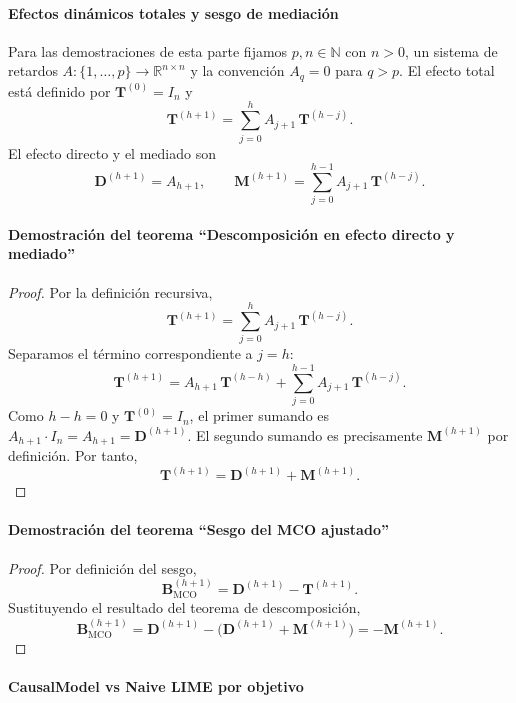 \documentclass[12pt]{report} %
\begin{document}
\paragraph*{Efectos dinámicos totales y sesgo de mediación}

Para las demostraciones de esta parte fijamos $p, n \in \mathbb{N}$ con $n > 0$, un sistema de retardos $A : \{1, \ldots, p\} \to \mathbb{R}^{n \times n}$ y la convención $A_q = 0$ para $q > p$. El efecto total está definido por $\mathbf{T}^{(0)} = I_n$ y
$$\mathbf{T}^{(h+1)} = \sum_{j=0}^{h} A_{j+1}\,\mathbf{T}^{(h-j)}.$$
El efecto directo y el mediado son
$$\mathbf{D}^{(h+1)} = A_{h+1}, \qquad \mathbf{M}^{(h+1)} = \sum_{j=0}^{h-1} A_{j+1}\,\mathbf{T}^{(h-j)}.$$

\paragraph*{Demostración del teorema ``Descomposición en efecto directo y mediado''}
\begin{proof}
    Por la definición recursiva,
    $$\mathbf{T}^{(h+1)} = \sum_{j=0}^{h} A_{j+1}\,\mathbf{T}^{(h-j)}.$$
    Separamos el término correspondiente a $j = h$:
    $$\mathbf{T}^{(h+1)} = A_{h+1}\,\mathbf{T}^{(h-h)} + \sum_{j=0}^{h-1} A_{j+1}\,\mathbf{T}^{(h-j)}.$$
    Como $h - h = 0$ y $\mathbf{T}^{(0)} = I_n$, el primer sumando es $A_{h+1} \cdot I_n = A_{h+1} = \mathbf{D}^{(h+1)}$. El segundo sumando es precisamente $\mathbf{M}^{(h+1)}$ por definición. Por tanto,
    $$\mathbf{T}^{(h+1)} = \mathbf{D}^{(h+1)} + \mathbf{M}^{(h+1)}.$$
\end{proof}

\paragraph*{Demostración del teorema ``Sesgo del MCO ajustado''}
\begin{proof}
    Por definición del sesgo,
    $$\mathbf{B}_{\mathrm{MCO}}^{(h+1)} = \mathbf{D}^{(h+1)} - \mathbf{T}^{(h+1)}.$$
    Sustituyendo el resultado del teorema de descomposición,
    $$\mathbf{B}_{\mathrm{MCO}}^{(h+1)} = \mathbf{D}^{(h+1)} - \bigl(\mathbf{D}^{(h+1)} + \mathbf{M}^{(h+1)}\bigr) = -\mathbf{M}^{(h+1)}.$$
\end{proof}

\paragraph*{CausalModel vs Naive LIME por objetivo}
\end{document}
